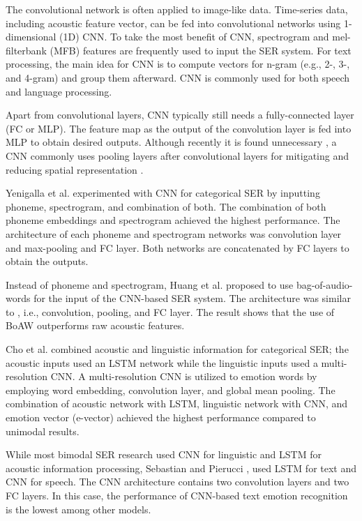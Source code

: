 The convolutional network is often applied to image-like data. Time-series
data, including acoustic feature vector, can be fed into convolutional networks
using 1-dimensional (1D) CNN. To take the most benefit of CNN, spectrogram and
mel-filterbank (MFB) features are frequently used to input the SER system. For
text processing, the main idea for CNN is to compute vectors for n-gram (e.g.,
2-, 3-, and 4-gram) and group them afterward. CNN is commonly used for both
speech and language processing. 

Apart from convolutional layers, CNN typically still needs a fully-connected
layer (FC or MLP). The feature map as the output of the convolution layer is
fed into MLP to obtain desired outputs. Although recently it is found
unnecessary \cite{Springenberg2015}, a CNN commonly uses pooling layers after
convolutional layers for mitigating and reducing spatial representation
\cite{Zhang2020}.

Yenigalla et al. \cite{Yenigalla2018} experimented with CNN for categorical
SER by inputting phoneme, spectrogram, and combination of both. The combination
of both phoneme embeddings and spectrogram achieved the highest performance.
The architecture of each phoneme and spectrogram networks was convolution layer
and max-pooling and FC layer. Both networks are concatenated by FC layers
to obtain the outputs.

Instead of phoneme and spectrogram, Huang et al. \cite{Huang2018} proposed to
use bag-of-audio-words for the input of the CNN-based SER system. The
architecture was similar to \cite{Yenigalla2018}, i.e., convolution, pooling,
and FC layer.  The result shows that the use of BoAW outperforms raw acoustic
features.

Cho et al. \cite{Cho2018} combined acoustic and linguistic information for
categorical SER; the acoustic inputs used an LSTM network while the linguistic
inputs used a multi-resolution CNN. A multi-resolution CNN is utilized to
emotion words by employing word embedding, convolution layer, and global mean
pooling. The combination of acoustic network with LSTM, linguistic network with
CNN, and emotion vector (e-vector) achieved the highest performance compared to
unimodal results.

While most bimodal SER research used CNN for linguistic and LSTM for acoustic
information processing, Sebastian and Pierucci \cite{Sebastian2019}, used LSTM
for text and CNN for speech. The CNN architecture contains two convolution
layers and two FC layers. In this case, the performance of CNN-based text
emotion recognition is the lowest among other models.


